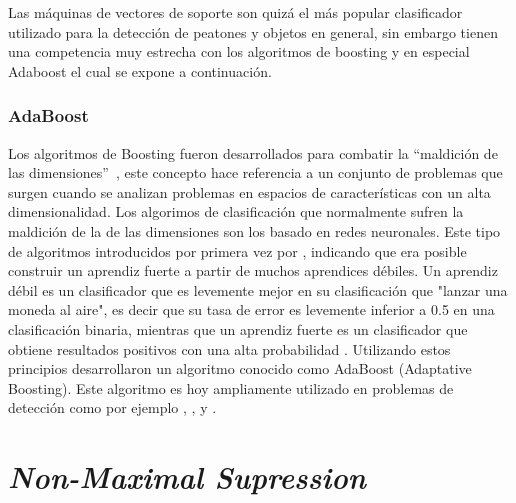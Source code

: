 
Las máquinas de vectores de soporte son quizá el más popular clasificador utilizado para la detección de peatones y objetos en general, sin embargo tienen una competencia muy estrecha con los algoritmos de boosting y en especial Adaboost el cual se expone a continuación.

\subsubsection{AdaBoost}

Los algoritmos de Boosting fueron desarrollados para combatir la ``maldición de las dimensiones''~\citep{bellman1961adaptive}, este concepto hace referencia a un conjunto de problemas que surgen cuando se analizan problemas en espacios de características con un alta dimensionalidad. Los algorimos de clasificación que normalmente sufren la maldición de la de las dimensiones son los basado en redes neuronales. 
Este tipo de algoritmos introducidos por primera vez por \cite{Schapire1990}, indicando que era posible construir un aprendiz fuerte a partir de muchos aprendices débiles. Un aprendiz débil es un clasificador que es levemente mejor en su clasificación que "lanzar una moneda al aire", es decir que su tasa de error es levemente inferior a 0.5 en una clasificación binaria, mientras que un aprendiz fuerte es un clasificador que obtiene resultados positivos con una alta probabilidad \citep{Kearns1994}. Utilizando estos principios \cite{Freund1995} desarrollaron un algoritmo conocido como AdaBoost (Adaptative Boosting). Este algoritmo es hoy ampliamente utilizado en problemas de detección como por ejemplo \cite{viola2001}, \cite{dollar2009a}, \cite{Dollar2010} y \cite{wojek2008}. 

\section{\textit{Non-Maximal Supression}}
\label{preliminares:nms}


